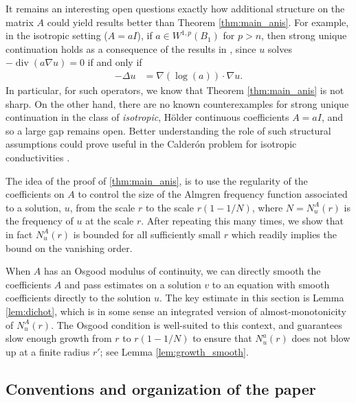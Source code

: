 \documentclass[12pt,leqno]{amsart}
\numberwithin{equation}{section}
\theoremstyle{definition}
\DeclareMathOperator{\divv}{\mathrm{div}}
\begin{document}
It remains an interesting open questions exactly how additional structure on the matrix $A$ could yield results better than Theorem \ref{thm:main_anis}. For example, in the isotropic setting ($A = aI$), if $a \in W^{1,p}(B_1)$ for $p > n$, then strong unique continuation holds as a consequence of the results in \cite{Wolff92, KT01}, since $u$ solves $-\divv (a \nabla u) = 0$ if and only if 
\begin{align}\label{eqn:iso_reform}
	- \Delta u & = \nabla (\log(a)) \cdot \nabla u.
\end{align}
In particular, for such operators, we know that Theorem \ref{thm:main_anis} is not sharp. On the other hand, there are no known counterexamples for strong unique continuation in the class of \textit{isotropic}, H\"{o}lder continuous coefficients $A = aI$, and so a large gap remains open. Better understanding the role of such structural assumptions could prove useful in the Calder\'{o}n problem for isotropic conductivities \cite{Haberman15, CR16}.


\vspace{0.5em}

The idea of the proof of \ref{thm:main_anis}, is to use the regularity of the coefficients on $A$ to control the size of the Almgren frequency function associated to a solution, $u$, from the scale $r$ to the scale $r(1-1/N)$, where $N = N_u^A(r)$ is the frequency of $u$ at the scale $r$. After repeating this many times, we show that in fact $N_u^A(r)$ is bounded for all sufficiently small $r$ which readily implies the bound on the vanishing order.

When $A$ has an Osgood modulus of continuity, we can directly smooth the coefficients $A$ and pass estimates on a solution $v$ to an equation with smooth coefficients directly to the solution $u$. The key estimate in this section is Lemma \ref{lem:dichot}, which is in some sense an integrated version of almost-monotonicity of $N_u^A(r)$. The Osgood condition is well-suited to this context, and guarantees slow enough growth from $r$ to $r(1-1/N)$ to ensure that $N_u^a(r)$ does not blow up at a finite radius $r'$; see Lemma \ref{lem:growth_smooth}. 



\subsection{Conventions and organization of the paper}
\end{document}
